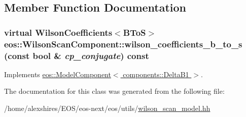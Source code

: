 \subsection{Member Function Documentation}
\hypertarget{classeos_1_1WilsonScanComponent_afcad159e4ff8fa11d5ea4a5d41f534ad}{
\subsubsection[{wilson\_\-coefficients\_\-b\_\-to\_\-s}]{\setlength{\rightskip}{0pt plus 5cm}virtual WilsonCoefficients$<${\bf BToS}$>$ eos::WilsonScanComponent::wilson\_\-coefficients\_\-b\_\-to\_\-s (const bool \& {\em cp\_\-conjugate}) const}}
\label{classeos_1_1WilsonScanComponent_afcad159e4ff8fa11d5ea4a5d41f534ad}


Implements \hyperlink{classeos_1_1ModelComponent_3_01components_1_1DeltaB1_01_4_a94a836d0f2518023cca37a1ffaa128e9}{eos::ModelComponent$<$ components::DeltaB1 $>$}.

The documentation for this class was generated from the following file:\begin{DoxyCompactItemize}
\item 
/home/alexshires/EOS/eos-\/next/eos/utils/\hyperlink{wilson__scan__model_8hh}{wilson\_\-scan\_\-model.hh}\end{DoxyCompactItemize}
